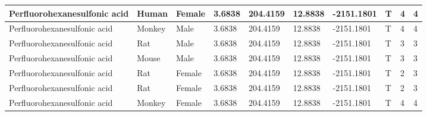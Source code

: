 \begin{table}[H]
{\begin{tabular}{|l|l|l|l|l|l|l|l|l|l|}
Perfluorohexanesulfonic   acid & Human & Female & 3.6838 & 204.4159 & 12.8838 & -2151.1801 & T & 4 & 4 \\ \hline
Perfluorohexanesulfonic   acid & Monkey & Male & 3.6838 & 204.4159 & 12.8838 & -2151.1801 & T & 4 & 4 \\ \hline
Perfluorohexanesulfonic   acid & Rat & Male & 3.6838 & 204.4159 & 12.8838 & -2151.1801 & T & 3 & 3 \\ \hline
Perfluorohexanesulfonic   acid & Mouse & Male & 3.6838 & 204.4159 & 12.8838 & -2151.1801 & T & 3 & 3 \\ \hline
\rowcolor[HTML]{DAE9F8} 
Perfluorohexanesulfonic   acid & Rat & Female & 3.6838 & 204.4159 & 12.8838 & -2151.1801 & T & 2 & 3 \\ \hline
\rowcolor[HTML]{DAE9F8} 
Perfluorohexanesulfonic   acid & Rat & Female & 3.6838 & 204.4159 & 12.8838 & -2151.1801 & T & 2 & 3 \\ \hline
Perfluorohexanesulfonic   acid & Monkey & Female & 3.6838 & 204.4159 & 12.8838 & -2151.1801 & T & 4 & 4 \\ \hline

\end{tabular}%
}
\end{table}


